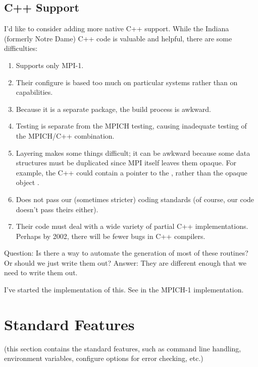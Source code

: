 \documentclass{article}
\begin{document}
\subsection{C++ Support}
\label{sec:c++}
I'd like to consider adding more native C++ support.  While the
Indiana (formerly Notre
Dame) C++ code is valuable and helpful, there are some difficulties:
\begin{enumerate}
\item Supports only MPI-1.

\item Their configure is based too much on particular systems rather than on
capabilities. 

\item Because it is a separate package, the build process is awkward.

\item Testing is separate from the MPICH testing, causing inadequate
testing of the MPICH/C++ combination.

\item Layering makes some things difficult; it can be awkward because
some data structures must be duplicated since MPI itself leaves them
opaque.  For example, the C++  could contain a pointer to the
, rather than the opaque object .

\item Does not pass our (sometimes stricter) coding standards (of course, our
  code doesn't pass theirs either).

\item Their code must deal with a wide variety of partial C++
implementations.  Perhaps by 2002, there will be fewer bugs in C++ compilers.
\end{enumerate}

Question: Is there a way to automate the generation of most of these routines?
Or should we just write them out?  Answer: They are different enough that we
need to write them out.

I've started the implementation of this.  See  in the
MPICH-1 implementation.

\section{Standard Features}
\label{sec:standard-features}
(this section contains the standard features, such as command line
handling, environment variables, configure options for error checking,
etc.)
\end{document}
